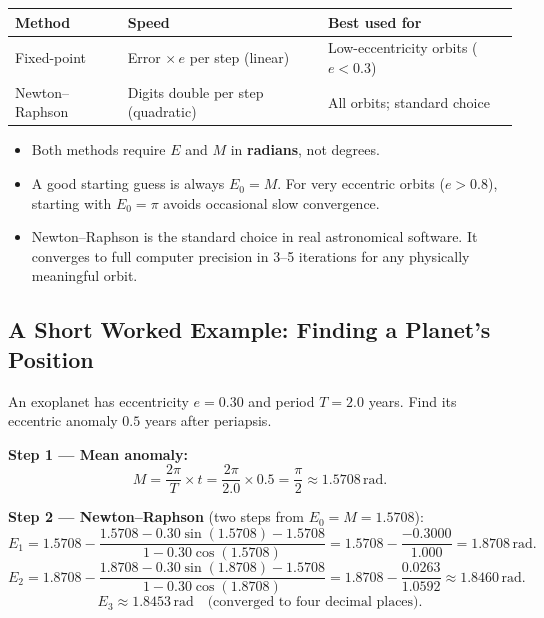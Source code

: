 \documentclass[12pt]{article}
\newenvironment{notebox}[1]{%
  \begin{tcolorbox}[
    enhanced, breakable,
    colback=blue!3!white, colframe=deepblue,
    boxrule=0.7pt, arc=4pt,
    title={\bfseries #1}
  ]
}{\end{tcolorbox}}
\begin{document}
\begin{center}
\renewcommand{\arraystretch}{1.5}
\begin{tabular}{lll}
  \toprule
  \textbf{Method} & \textbf{Speed} & \textbf{Best used for} \\
  \midrule
  Fixed-point    & Error $\times\,e$ per step (linear)   & Low-eccentricity orbits ($e < 0.3$) \\
  Newton--Raphson & Digits double per step (quadratic)    & All orbits; standard choice \\
  \bottomrule
\end{tabular}
\end{center}

\begin{notebox}{Practical Guidelines}
\begin{itemize}
  \item Both methods require $E$ and $M$ in \textbf{radians}, not degrees.
  \item A good starting guess is always $E_0 = M$. For very eccentric orbits
        ($e > 0.8$), starting with $E_0 = \pi$ avoids occasional slow convergence.
  \item Newton--Raphson is the standard choice in real astronomical software. It
        converges to full computer precision in 3--5 iterations for any physically
        meaningful orbit.
\end{itemize}
\end{notebox}

\subsection{A Short Worked Example: Finding a Planet's Position}

An exoplanet has eccentricity $e = 0.30$ and period $T = 2.0$ years.
Find its eccentric anomaly $0.5$ years after periapsis.

\textbf{Step 1 --- Mean anomaly:}
\[
  M = \frac{2\pi}{T} \times t = \frac{2\pi}{2.0} \times 0.5 = \frac{\pi}{2}
    \approx 1.5708\,\text{rad}.
\]

\textbf{Step 2 --- Newton--Raphson} (two steps from $E_0 = M = 1.5708$):
\[
  E_1 = 1.5708 - \frac{1.5708 - 0.30\sin(1.5708) - 1.5708}{1 - 0.30\cos(1.5708)}
      = 1.5708 - \frac{-0.3000}{1.000} = 1.8708\,\text{rad}.
\]
\[
  E_2 = 1.8708 - \frac{1.8708 - 0.30\sin(1.8708) - 1.5708}{1 - 0.30\cos(1.8708)}
      = 1.8708 - \frac{0.0263}{1.0592} \approx 1.8460\,\text{rad}.
\]
\[
  E_3 \approx 1.8453\,\text{rad} \quad\text{(converged to four decimal places)}.
\]
\end{document}
